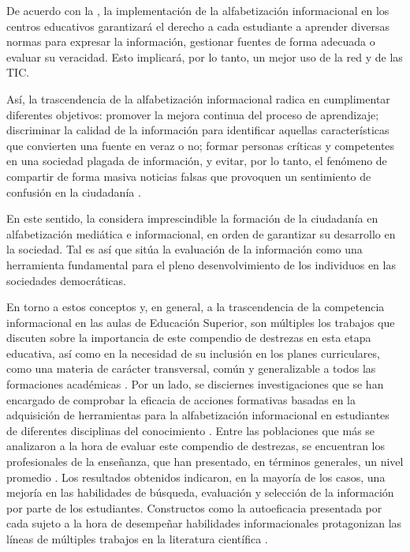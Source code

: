 \documentclass[spanish]{textolivre}
\begin{document}
De acuerdo con la \cite{oecd2017}, %
la implementación de la alfabetización informacional en los centros educativos garantizará el derecho a cada estudiante a aprender diversas normas para expresar la información, gestionar fuentes de forma adecuada o evaluar su veracidad. Esto implicará, por lo tanto, un mejor uso de la red y de las TIC.

Así, la trascendencia de la alfabetización informacional radica en cumplimentar diferentes objetivos: promover la mejora continua del proceso de aprendizaje; discriminar la calidad de la información para identificar aquellas características que convierten una fuente en veraz o no; formar personas críticas y competentes en una sociedad plagada de información, y evitar, por lo tanto, el fenómeno de compartir de forma masiva noticias falsas que provoquen un sentimiento de confusión en la ciudadanía \cite{balcer2020, klucevsek2017}. %

En este sentido, la \cite{unesco2016} %
considera imprescindible la formación de la ciudadanía en alfabetización mediática e informacional, en orden de garantizar su desarrollo en la sociedad. Tal es así que sitúa la evaluación de la información como una herramienta fundamental para el pleno desenvolvimiento de los individuos en las sociedades democráticas.

En torno a estos conceptos y, en general, a la trascendencia de la competencia informacional en las aulas de Educación Superior, son múltiples los trabajos que discuten sobre la importancia de este compendio de destrezas en esta etapa educativa, así como en la necesidad de su inclusión en los planes curriculares, como una materia de carácter transversal, común y generalizable a todos las formaciones académicas \cite{waltz2020}. %
Por un lado, se disciernes investigaciones que se han encargado de comprobar la eficacia de acciones formativas basadas en la adquisición de herramientas para la alfabetización informacional en estudiantes de diferentes disciplinas del conocimiento \cite{ball2019, george2019, lantz2019, sanches2019}. %
Entre las poblaciones que más se analizaron a la hora de evaluar este compendio de destrezas, se encuentran los profesionales de la enseñanza, que han presentado, en términos generales, un nivel promedio \cite{oliveira2019, godbey2018, bougatzeli2015}. %
Los resultados obtenidos indicaron, en la mayoría de los casos, una mejoría en las habilidades de búsqueda, evaluación y selección de la información por parte de los estudiantes. Constructos como la autoeficacia presentada por cada sujeto a la hora de desempeñar habilidades informacionales protagonizan las líneas de múltiples trabajos en la literatura científica \cite{demeulemeesteretal2019, demeulemeester2018}. %
\end{document}

